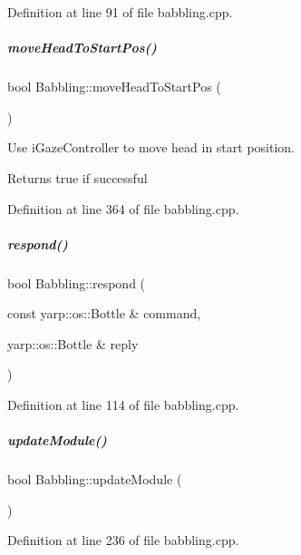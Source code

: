 Definition at line 91 of file babbling.\+cpp.

\mbox{\label{group__babbling_a5c0c4032800175a9f2f57fbe9de9037b}} 
\subparagraph{\texorpdfstring{move\+Head\+To\+Start\+Pos()}{moveHeadToStartPos()}}
{\footnotesize\ttfamily bool Babbling\+::move\+Head\+To\+Start\+Pos (\begin{DoxyParamCaption}{ }\end{DoxyParamCaption})\hspace{0.3cm}{\ttfamily [protected]}}



Use i\+Gaze\+Controller to move head in start position. 

\begin{DoxyReturn}{Returns}
true if successful 
\end{DoxyReturn}


Definition at line 364 of file babbling.\+cpp.

\mbox{\label{group__babbling_ade91925b1045c2d45603e49e8fa45356}} 
\subparagraph{\texorpdfstring{respond()}{respond()}}
{\footnotesize\ttfamily bool Babbling\+::respond (\begin{DoxyParamCaption}\item[{const yarp\+::os\+::\+Bottle \&}]{command,  }\item[{yarp\+::os\+::\+Bottle \&}]{reply }\end{DoxyParamCaption})}



Definition at line 114 of file babbling.\+cpp.

\mbox{\label{group__babbling_a214e419246e93718c263850171a67a31}} 
\subparagraph{\texorpdfstring{update\+Module()}{updateModule()}}
{\footnotesize\ttfamily bool Babbling\+::update\+Module (\begin{DoxyParamCaption}{ }\end{DoxyParamCaption})}



Definition at line 236 of file babbling.\+cpp.



